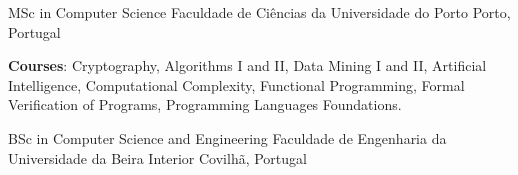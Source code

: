 


\begin{cventries}

\cventry
  {MSc in Computer Science}
  {Faculdade de Ciências da Universidade do Porto}
  {Porto, Portugal}
  {}
  {
    \begin{cvitems}
      \item \textbf{Courses}:
      Cryptography,
      Algorithms I and II,
      Data Mining I and II,
      Artificial Intelligence,
      Computational Complexity,
      Functional Programming,
      Formal Verification of Programs,
      Programming Languages Foundations.
    \end{cvitems}
  }
  {}

\cventry
  {BSc in Computer Science and Engineering}
  {Faculdade de Engenharia da Universidade da Beira Interior}
  {Covilhã, Portugal}
  {}
  {}
  {}


\end{cventries}

